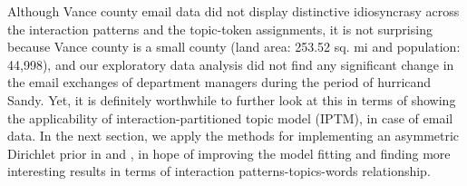 \documentclass[a4paper]{article}
\begin{document}
\normalsize
\begin{table}[ht]
	\centering
		\caption {Summary of top 10 words that have the highest probability conditioned on the interaction patterns}
		\label{table:VancewordsMCMC2}
	\end{table}
	\normalsize
\newline
Although Vance county email data did not display distinctive idiosyncrasy across the interaction patterns and the topic-token assignments, it is not surprising because Vance county is a small county (land area: 253.52 sq. mi and population: 44,998), and our exploratory data analysis did not find any significant change in the email exchanges of department managers during the period of hurricand Sandy. Yet, it is definitely worthwhile to further look at this in terms of showing the applicability of interaction-partitioned topic model (IPTM), in case of email data. In the next section, we apply the methods for implementing an asymmetric Dirichlet prior in \cite{wallach2008structured} and \cite{wallach2009rethinking}, in hope of improving the model fitting and finding more interesting results in terms of interaction patterns-topics-words relationship.
\newpage
\end{document}

